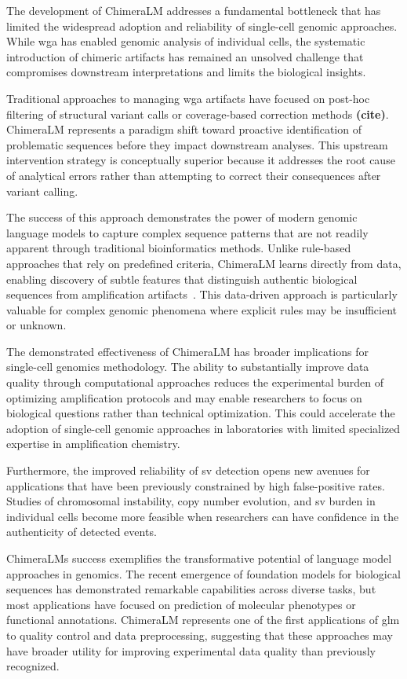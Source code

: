 \documentclass[pdflatex,sn-nature]{sn-jnl}%
\theoremstyle{thmstyleone}%
\theoremstyle{thmstyletwo}%
\theoremstyle{thmstylethree}%
\begin{document}
The development of ChimeraLM addresses a fundamental bottleneck that has limited the widespread adoption and reliability of single-cell genomic approaches.
While \gls{wga} has enabled genomic analysis of individual cells, the systematic introduction of chimeric artifacts has remained an unsolved challenge that compromises downstream interpretations and limits the biological insights.

Traditional approaches to managing \gls{wga} artifacts have focused on post-hoc filtering of structural variant calls or coverage-based correction methods \textbf{(cite)}.
ChimeraLM represents a paradigm shift toward proactive identification of problematic sequences before they impact downstream analyses.
This upstream intervention strategy is conceptually superior because it addresses the root cause of analytical errors rather than attempting to correct their consequences after variant calling.

The success of this approach demonstrates the power of modern genomic language models to capture complex sequence patterns that are not readily apparent through traditional bioinformatics methods.
Unlike rule-based approaches that rely on predefined criteria, ChimeraLM learns directly from data, enabling discovery of subtle features that distinguish authentic biological sequences from amplification artifacts~\cite{lu2023exploration, agyabeng2025evaluating, nguyen2023hyenadna}.
This data-driven approach is particularly valuable for complex genomic phenomena where explicit rules may be insufficient or unknown.

The demonstrated effectiveness of ChimeraLM has broader implications for single-cell genomics methodology.
The ability to substantially improve data quality through computational approaches reduces the experimental burden of optimizing amplification protocols and may enable researchers to focus on biological questions rather than technical optimization.
This could accelerate the adoption of single-cell genomic approaches in laboratories with limited specialized expertise in amplification chemistry.

Furthermore, the improved reliability of \gls{sv} detection opens new avenues for applications that have been previously constrained by high false-positive rates.
Studies of chromosomal instability, copy number evolution, and \gls{sv} burden in individual cells become more feasible when researchers can have confidence in the authenticity of detected events.

ChimeraLM\textquotesingle s success exemplifies the transformative potential of language model approaches in genomics.
The recent emergence of foundation models for biological sequences has demonstrated remarkable capabilities across diverse tasks, but most applications have focused on prediction of molecular phenotypes or functional annotations.
ChimeraLM represents one of the first applications of \gls{glm} to quality control and data preprocessing, suggesting that these approaches may have broader utility for improving experimental data quality than previously recognized.
\end{document}
